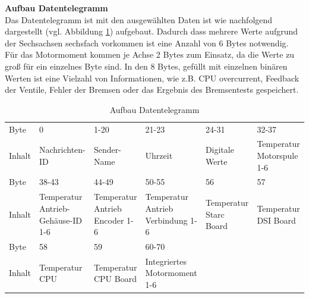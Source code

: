 \documentclass[ a4paper,
                oneside,
                toc=bibliography,
                toc=listof
                ]{scrbook}
\begin{document}
	\textbf{Aufbau Datentelegramm}\\
	Das Datentelegramm ist mit den ausgewählten Daten ist wie nachfolgend dargestellt (vgl. Abbildung \ref{tab:Datentelegramm}) aufgebaut.
	Dadurch dass mehrere Werte aufgrund der Sechsachsen sechsfach vorkommen ist eine Anzahl von 6 Bytes notwendig. Für das Motormoment kommen je Achse 2 Bytes zum Einsatz, da die Werte zu groß für ein einzelnes Byte sind. In den 8 Bytes, gefüllt mit einzelnen binären Werten ist eine Vielzahl von Informationen, wie z.B. CPU overcurrent, Feedback der Ventile, Fehler der Bremsen oder das Ergebnis des Bremsentests gespeichert.
	\begin{table}
		\centering
		\caption{Aufbau Datentelegramm}
		\label{tab:Datentelegramm}
		\begin{tabular}{|p{1cm}|p{2.2cm}|p{2.2cm}|p{2.2cm}|p{2.2cm}|p{2.2cm}|}
			\hline
			Byte& 0 & 1-20 & 21-23 & 24-31 & 32-37  \\
			Inhalt & Nachrichten-ID & Sender-Name & Uhrzeit & Digitale Werte & Temperatur Motorspule 1-6\\
			\hline
			Byte& 38-43 & 44-49 & 50-55 & 56 & 57  \\
			Inhalt & Temperatur Antrieb-Gehäuse-ID 1-6 & Temperatur Antrieb Encoder 1-6 & Temperatur Antrieb Verbindung 1-6& Temperatur Starc Board & Temperatur DSI Board\\
			\hline
			Byte& 58 & 59 & 60-70 &  &   \\
			Inhalt & Temperatur CPU & Temperatur CPU Board & Integriertes Motormoment 1-6&  & \\
			\hline
		\end{tabular}
	\end{table}
	
	\newpage
\end{document}

